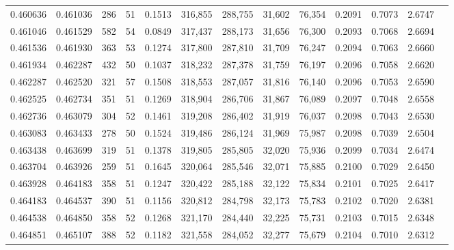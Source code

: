 \begin{tabular}{rrrrrrrrrrrrr}
0.460636 & 0.461036 &   286 &  51 &                                     0.1513 & 316,855 & 288,755 &  31,602 &  76,354 & 0.2091 & 0.7073 & 2.6747 \\
0.461046 & 0.461529 &   582 &  54 &                                     0.0849 & 317,437 & 288,173 &  31,656 &  76,300 & 0.2093 & 0.7068 & 2.6694 \\
0.461536 & 0.461930 &   363 &  53 &                                     0.1274 & 317,800 & 287,810 &  31,709 &  76,247 & 0.2094 & 0.7063 & 2.6660 \\
0.461934 & 0.462287 &   432 &  50 &                                     0.1037 & 318,232 & 287,378 &  31,759 &  76,197 & 0.2096 & 0.7058 & 2.6620 \\
0.462287 & 0.462520 &   321 &  57 &                                     0.1508 & 318,553 & 287,057 &  31,816 &  76,140 & 0.2096 & 0.7053 & 2.6590 \\
0.462525 & 0.462734 &   351 &  51 &                                     0.1269 & 318,904 & 286,706 &  31,867 &  76,089 & 0.2097 & 0.7048 & 2.6558 \\
0.462736 & 0.463079 &   304 &  52 &                                     0.1461 & 319,208 & 286,402 &  31,919 &  76,037 & 0.2098 & 0.7043 & 2.6530 \\
0.463083 & 0.463433 &   278 &  50 &                                     0.1524 & 319,486 & 286,124 &  31,969 &  75,987 & 0.2098 & 0.7039 & 2.6504 \\
0.463438 & 0.463699 &   319 &  51 &                                     0.1378 & 319,805 & 285,805 &  32,020 &  75,936 & 0.2099 & 0.7034 & 2.6474 \\
0.463704 & 0.463926 &   259 &  51 &                                     0.1645 & 320,064 & 285,546 &  32,071 &  75,885 & 0.2100 & 0.7029 & 2.6450 \\
0.463928 & 0.464183 &   358 &  51 &                                     0.1247 & 320,422 & 285,188 &  32,122 &  75,834 & 0.2101 & 0.7025 & 2.6417 \\
0.464183 & 0.464537 &   390 &  51 &                                     0.1156 & 320,812 & 284,798 &  32,173 &  75,783 & 0.2102 & 0.7020 & 2.6381 \\
0.464538 & 0.464850 &   358 &  52 &                                     0.1268 & 321,170 & 284,440 &  32,225 &  75,731 & 0.2103 & 0.7015 & 2.6348 \\
0.464851 & 0.465107 &   388 &  52 &                                     0.1182 & 321,558 & 284,052 &  32,277 &  75,679 & 0.2104 & 0.7010 & 2.6312 \\

\end{tabular}
